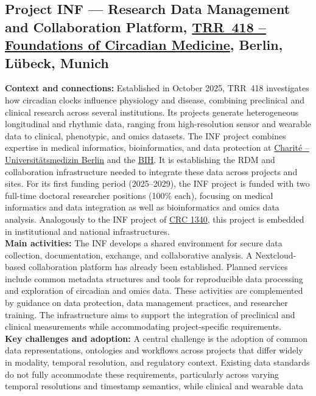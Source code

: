 \documentclass{eceasst}
\begin{document}
\subsection{Project INF --- Research Data Management and Collaboration Platform,
\href{https://gepris.dfg.de/gepris/projekt/541063275?language=en}
{TRR~418 -- Foundations of Circadian Medicine}, Berlin, Lübeck, Munich}
\label{subsec:trr418}
\noindent\textbf{Context and connections:}
Established in October 2025, TRR~418 investigates how
circadian clocks influence physiology and disease,
combining preclinical and clinical research across
several institutions. Its projects generate heterogeneous
longitudinal and rhythmic data, ranging from high-resolution sensor
and wearable data to clinical, phenotypic, and omics datasets.
The INF project combines expertise in medical informatics,
bioinformatics, and data protection at \href{https://www.charite.de}{Charité --
Universitätsmedizin Berlin} and the \href{https://www.bihealth.org}{BIH}. It is establishing the RDM and collaboration infrastructure
needed to integrate these data across projects and sites.
For its first funding period (2025–2029),
the INF project is funded with two full-time
doctoral researcher positions (100\% each),
focusing on medical informatics and data integration
as well as bioinformatics and omics data analysis.
Analogously to the INF project of \hyperref[subsec:crc1340]{CRC 1340},
this project is embedded in institutional and national infrastructures.
\\
\noindent\textbf{Main activities:}
The INF develops a shared environment for secure data
collection, documentation, exchange, and collaborative
analysis. A Nextcloud-based collaboration platform has already
been established. Planned services include
common metadata structures and tools for
reproducible data processing and exploration of
circadian and omics data.
These activities are complemented by guidance on data
protection, data management practices, and researcher
training. The infrastructure aims to support the
integration of preclinical and clinical measurements
while accommodating project-specific requirements.
\\
\noindent\textbf{Key challenges and adoption:}
A central challenge is the adoption of common data
representations, ontologies and workflows across projects
that differ widely in modality, temporal resolution, and regulatory context.
Existing data standards do not fully accommodate these
requirements, particularly across varying temporal resolutions
and timestamp semantics, while clinical and wearable data
\end{document}
